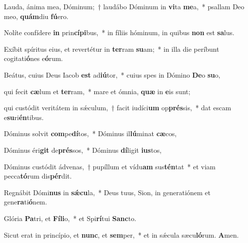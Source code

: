 \item Lauda, ánima mea, Dóminum;~† laudábo Dóminum in \textbf{vi}ta \textbf{me}a,~* psallam Deo meo, \textbf{quám}diu \textbf{fú}ero.

\item Nolíte confídere \textbf{in} prin\textbf{cí}\textbf{pi}bus,~* in fíliis hóminum, in quibus \textbf{non} est \textbf{sa}lus.

\item Exíbit spíritus eius, et revertétur in \textbf{ter}ram \textbf{su}am;~* in illa die períbunt cogitati\textbf{ó}nes e\textbf{ó}rum.

\item Beátus, cuius Deus Iacob \textbf{est} ad\textbf{iú}tor,~* cuius spes in Dómino \textbf{De}o \textbf{su}o,

\item qui fecit \textbf{cæ}lum et \textbf{ter}ram,~* mare et ómnia, \textbf{quæ} in \textbf{e}is sunt;

\item qui custódit veritátem in sǽculum,~† facit iudíci\textbf{um} op\textbf{prés}sis,~* dat escam e\textbf{su}ri\textbf{én}tibus.

\item Dóminus solvit \textbf{com}pe\textbf{dí}tos,~* Dóminus il\textbf{lú}minat \textbf{cæ}cos,

\item Dóminus éri\textbf{git} de\textbf{prés}sos,~* Dóminus \textbf{dí}ligit \textbf{ius}tos,

\item Dóminus custódit ádvenas,~† pupíllum et vídu\textbf{am} sus\textbf{tén}tat~* et viam pecca\textbf{tó}rum dis\textbf{pér}dit.

\item Regnábit Dómi\textbf{nus} in \textbf{sǽ}\textbf{cu}la,~* Deus tuus, Sion, in generatiónem et gene\textbf{ra}ti\textbf{ó}nem.

\item Glória \textbf{Pa}tri, et \textbf{Fí}\textbf{li}o,~* et Spi\textbf{rí}tui \textbf{Sanc}to.

\item Sicut erat in princípio, et \textbf{nunc}, et \textbf{sem}per,~* et in sǽcula sæcu\textbf{ló}rum. \textbf{A}men.